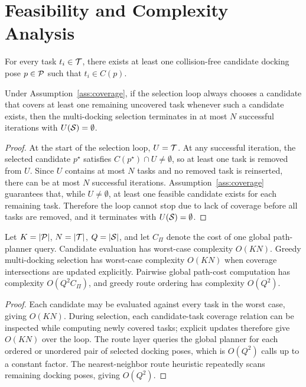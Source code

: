 \section{Feasibility and Complexity Analysis}
\label{sec:analysis}

\begin{assumption}
\label{ass:coverage}
For every task \(t_i\in\mathcal{T}\), there exists at least one collision-free candidate docking pose \(p\in\mathcal{P}\) such that \(t_i\in C(p)\).
\end{assumption}

\begin{proposition}
\label{prop:coverage}
Under Assumption~\ref{ass:coverage}, if the selection loop always chooses a candidate that covers at least one remaining uncovered task whenever such a candidate exists, then the multi-docking selection terminates in at most \(N\) successful iterations with \(U(\mathcal{S})=\emptyset\).
\end{proposition}

\begin{proof}
At the start of the selection loop, \(U=\mathcal{T}\). At any successful iteration, the selected candidate \(p^\star\) satisfies \(C(p^\star)\cap U\neq\emptyset\), so at least one task is removed from \(U\). Since \(U\) contains at most \(N\) tasks and no removed task is reinserted, there can be at most \(N\) successful iterations. Assumption~\ref{ass:coverage} guarantees that, while \(U\neq\emptyset\), at least one feasible candidate exists for each remaining task. Therefore the loop cannot stop due to lack of coverage before all tasks are removed, and it terminates with \(U(\mathcal{S})=\emptyset\).
\end{proof}

\begin{proposition}
\label{prop:complexity}
Let \(K=|\mathcal{P}|\), \(N=|\mathcal{T}|\), \(Q=|\mathcal{S}|\), and let \(C_{\Pi}\) denote the cost of one global path-planner query. Candidate evaluation has worst-case complexity \(O(KN)\). Greedy multi-docking selection has worst-case complexity \(O(KN)\) when coverage intersections are updated explicitly. Pairwise global path-cost computation has complexity \(O(Q^2 C_{\Pi})\), and greedy route ordering has complexity \(O(Q^2)\).
\end{proposition}

\begin{proof}
Each candidate may be evaluated against every task in the worst case, giving \(O(KN)\). During selection, each candidate-task coverage relation can be inspected while computing newly covered tasks; explicit updates therefore give \(O(KN)\) over the loop. The route layer queries the global planner for each ordered or unordered pair of selected docking poses, which is \(O(Q^2)\) calls up to a constant factor. The nearest-neighbor route heuristic repeatedly scans remaining docking poses, giving \(O(Q^2)\).
\end{proof}

